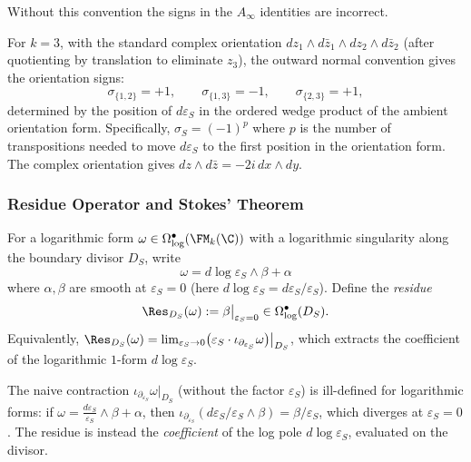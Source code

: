Without this convention the signs in the $A_\infty$ identities are incorrect.

\begin{example}[Orientation signs for $k=3$]
For $k=3$, with the standard complex orientation $dz_1 \wedge d\bar{z}_1 \wedge dz_2 \wedge d\bar{z}_2$ (after quotienting by translation to eliminate $z_3$), the outward normal convention gives the orientation signs:
\[
\sigma_{\{1,2\}} = +1, \qquad \sigma_{\{1,3\}} = -1, \qquad \sigma_{\{2,3\}} = +1,
\]
determined by the position of $d\varepsilon_S$ in the ordered wedge product of the ambient orientation form. Specifically, $\sigma_S = (-1)^p$ where $p$ is the number of transpositions needed to move $d\varepsilon_S$ to the first position in the orientation form. The complex orientation gives $dz \wedge d\bar{z} = -2i\, dx \wedge dy$.
\end{example}

\subsubsection{Residue Operator and Stokes' Theorem}

\begin{definition}
\label{def:residue_divisor}
For a logarithmic form $\omega \in \Omega^{\bullet}_{\log}(\FM_k(\C))$ with a logarithmic singularity along the boundary divisor $D_S$, write
\[
\omega = d\log\varepsilon_S \wedge \beta + \alpha
\]
where $\alpha, \beta$ are smooth at $\varepsilon_S = 0$ (here $d\log\varepsilon_S = d\varepsilon_S / \varepsilon_S$). Define the \emph{residue}
\[
\Res_{D_S}(\omega) := \beta\big|_{\varepsilon_S = 0} \in \Omega^{\bullet}_{\log}(D_S).
\]
Equivalently, $\Res_{D_S}(\omega) = \lim_{\varepsilon_S \to 0} \bigl(\varepsilon_S \cdot \iota_{\partial_{\varepsilon_S}} \omega\bigr)\big|_{D_S}$, which extracts the coefficient of the logarithmic $1$-form $d\log\varepsilon_S$.
\end{definition}

\begin{remark}
The naive contraction $\iota_{\partial_{\varepsilon_S}} \omega|_{D_S}$ (without the factor $\varepsilon_S$) is ill-defined for logarithmic forms: if $\omega = \frac{d\varepsilon_S}{\varepsilon_S} \wedge \beta + \alpha$, then $\iota_{\partial_{\varepsilon_S}}(d\varepsilon_S/\varepsilon_S \wedge \beta) = \beta/\varepsilon_S$, which diverges at $\varepsilon_S = 0$. The residue is instead the \emph{coefficient} of the log pole $d\log\varepsilon_S$, evaluated on the divisor.
\end{remark}

